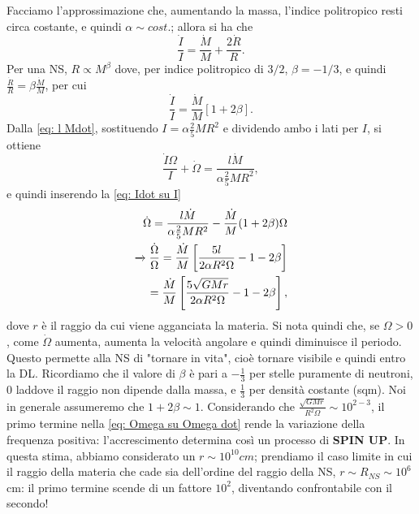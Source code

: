 Facciamo l'approssimazione che, aumentando la massa, l'indice politropico resti circa costante, e quindi $\alpha\sim cost.$; allora si ha che 
\begin{equation}
    \frac{\dot{I}}{I} = \frac{\dot{M}}{M} + \frac{2\dot{R}}{R}.
\end{equation}
Per una NS, $R\propto M^\beta$ dove, per indice politropico di $3/2$, $\beta = -1/3$, e quindi $\frac{\dot{R}}{R} = \beta\frac{\dot{M}}{M}$,  per cui 
\begin{equation}
    \frac{\dot{I}}{I} = \frac{\dot{M}}{M}\left[1+2\beta \right].
    \label{eq: Idot su I}
\end{equation}
Dalla \eqref{eq: l Mdot}, sostituendo $I = \alpha\frac{2}{5}MR^2$ e dividendo ambo i lati per $I$, si ottiene
\begin{equation}
    \frac{\dot{I}\Omega}{I} + \dot{\Omega} =\frac{l\dot{M}}{\alpha\frac{2}{5}MR^2},
\end{equation}
e quindi inserendo la \eqref{eq: Idot su I}
\begin{align}
    \dot{\Omega} = \frac{l\dot{M}}{\alpha\frac{2}{5}MR^2} - \frac{\dot{M}}{M}(1+2\beta)\Omega \notag\\
    \xrightarrow{} \frac{\dot{\Omega}}{\Omega} = \frac{\dot{M}}{M}\left[ \frac{5l}{2\alpha R^2\Omega}-1-2\beta \right]\notag\\
     =  \frac{\dot{M}}{M}\left[ \frac{5\sqrt{GMr}}{2\alpha R^2\Omega}-1-2\beta \right],
     \label{eq: Omega su Omega dot}
\end{align}
dove $r$ è il raggio da cui viene agganciata la materia.
Si nota quindi che, se $\Omega>0$, come $\dot{\Omega}$ aumenta, aumenta la velocità angolare e quindi diminuisce il periodo.
Questo permette alla NS di "tornare in vita", cioè tornare visibile e quindi entro la DL.
Ricordiamo che il valore di $\beta$ è pari a $-\frac{1}{3}$ per stelle puramente di neutroni, $0$ laddove il raggio non dipende dalla massa, e $\frac{1}{3}$ per densità costante (sqm).
Noi in generale assumeremo che $1+2\beta \sim 1$.
Considerando che $\frac{\sqrt{GMr}}{R^2\Omega}\sim10^{2-3}$, il primo termine nella \eqref{eq: Omega su Omega dot} rende la variazione della frequenza positiva: l'accrescimento determina così un processo di \textbf{SPIN UP}.
In questa stima, abbiamo considerato un $r\sim10^{10}cm$; prendiamo il caso limite in cui il raggio della materia che cade sia dell'ordine del raggio della NS, $r\sim R_{NS} \sim 10^6 $cm: il primo termine scende di un fattore $10^2$, diventando confrontabile con il secondo!

